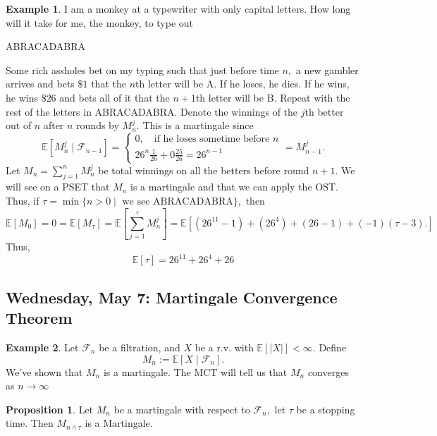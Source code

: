 \documentclass[10pt, oneside]{article}
\newcommand{\bbE}{\mathbb{E}}
\theoremstyle{definition}
\newtheorem{exmp}{Example}[section]
\newtheorem{prop}{Proposition}
\begin{document}
\begin{exmp}
    I am a monkey at a typewriter with only capital letters. How long will it take for me, the monkey, to type out 
    \begin{center}
        ABRACADABRA
    \end{center}
    Some rich assholes bet on my typing such that just before time $n,$ a new gambler arrives and bets $\$1$ that the $n$th letter will be A. If he loses, he dies. If he wins, he wins $\$26$ and bets all of it that the $n+1$th letter will be B. Repeat with the rest of the letters in ABRACADABRA. Denote the winnings of the $j$th better out of $n$ after $n$ rounds by $M_n^j.$ This is a martingale since 
    \[\bbE[M_n^j \mid \mathcal{F}_{n-1}] = \begin{cases}
        0, \quad \text{if he loses sometime before $n$}\\
        26^n \frac{1}{26} + 0 \frac{25}{26} = 26^{n-1}
    \end{cases} = M_{n-1}^j.\] Let $M_n = \sum_{j=1}^n M_n^j$ be total winnings on all the betters before round $n+1.$ We will see on a PSET that $M_n$ is a martingale and that we can apply the OST. Thus, if $\tau = \min\{n >0 \mid \text{ we see ABRACADABRA}\},$ then 
    \[\bbE[M_0] = 0 = \bbE[M_\tau] = \bbE[\sum_{j=1}^\tau M_n^j]= \bbE[(26^{11} - 1) + (26^4) + (26 -1) + (-1)(\tau - 3).]\] Thus, 
    \[\bbE[\tau] = 26^{11} + 26^4 + 26\]
\end{exmp}



\newpage
\subsection{Wednesday, May 7: Martingale Convergence Theorem}
\begin{exmp}
    Let $\mathcal{F}_n$ be a filtration, and $X$ be a r.v. with $\bbE[|X|]< \infty.$ Define 
    \[M_n:= \bbE[X \mid \mathcal{F}_n].\] We've shown that $M_n$ is a martingale. The MCT will tell us that $M_n$ converges as $n\to \infty$
\end{exmp}

\begin{prop}
    Let $M_n$ be a martingale with respect to $\mathcal{F}_n,$ let $\tau$ be a stopping time. Then $M_{n\wedge \tau}$ is a Martingale.
\end{prop}
\end{document}
